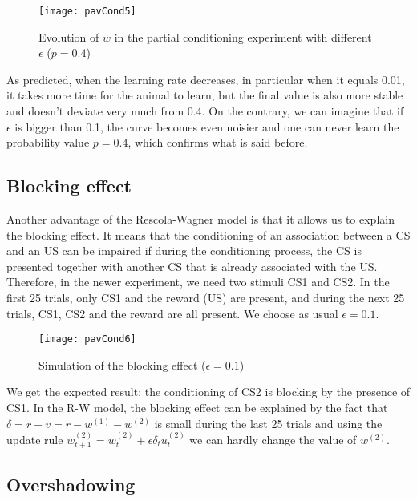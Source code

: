 \vspace{-1em}
\begin{figure}[H]
  \centering
  \texttt{[image: pavCond5]}
  \caption {Evolution of $w$ in the partial conditioning experiment with 
            different $\epsilon$ ($p = 0.4$)}
\end{figure}

As predicted, when the learning rate decreases, in particular when it equals 
0.01, it takes more time for the animal to learn, but the final value is also
more stable and doesn't deviate very much from 0.4. On the contrary, we can
imagine that if $\epsilon$ is bigger than 0.1, the curve becomes even noisier
and one can never learn the probability value $p = 0.4$, which 
confirms what is said before.

\subsection{Blocking effect}

Another advantage of the Rescola-Wagner model is that it allows us to explain
the blocking effect. It means that the conditioning of an association between
a CS and an US can be impaired if during the conditioning process, the CS is 
presented together with another CS that is already associated with the US. 
Therefore, in the newer experiment, we need two stimuli CS1 and CS2. In the 
first 25 trials, only CS1 and the reward (US) are present, and during the next
25 trials, CS1, CS2 and the reward are all present. We choose as usual 
$\epsilon = 0.1$. 

\vspace{-1em}
\begin{figure}[H]
  \centering
  \texttt{[image: pavCond6]}
  \caption {Simulation of the blocking effect ($\epsilon = 0.1$)}
\end{figure}

We get the expected result: the conditioning of CS2 is blocking by the 
presence of CS1.  In the R-W model, the blocking effect can be explained
by the fact that $\delta = r - v = r - w^{(1)} - w^{(2)}$ is small during the
last 25 trials and using the update rule 
$w_{t+1}^{(2)} = w_t^{(2)} + \epsilon\delta_t u_t^{(2)}$ we can hardly change 
the value of $w^{(2)}$.

\subsection{Overshadowing}

